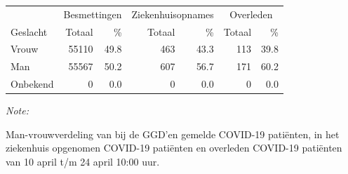 \documentclass[
  english,
  man,floatsintext]{apa6}
\begin{document}
\begin{table}
\centering\begingroup\fontsize{11}{13}\selectfont

\begin{threeparttable}
\begin{tabular}{lrrrrrr}
\toprule
\multicolumn{1}{c}{ } & \multicolumn{2}{c}{Besmettingen} & \multicolumn{2}{c}{Ziekenhuisopnames} & \multicolumn{2}{c}{Overleden} \\
\cmidrule(l{3pt}r{3pt}){2-3} \cmidrule(l{3pt}r{3pt}){4-5} \cmidrule(l{3pt}r{3pt}){6-7}
Geslacht & Totaal & \% & Totaal & \% & Totaal & \%\\
\midrule
Vrouw & 55110 & 49.8 & 463 & 43.3 & 113 & 39.8\\
Man & 55567 & 50.2 & 607 & 56.7 & 171 & 60.2\\
Onbekend & 0 & 0.0 & 0 & 0.0 & 0 & 0.0\\
\bottomrule
\end{tabular}
\begin{tablenotes}
\item \textit{Note: } 
\item Man-vrouwverdeling van bij de GGD’en gemelde COVID-19 patiënten, in het ziekenhuis opgenomen COVID-19 patiënten en overleden COVID-19 patiënten van 10 april t/m 24 april 10:00 uur.
\end{tablenotes}
\end{threeparttable}
\endgroup{}
\end{table}
\newpage
\end{document}

